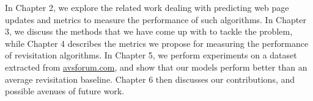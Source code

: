 In Chapter 2, we explore the related work dealing with predicting web page 
updates and metrics to measure the performance of such algorithms. 
In Chapter 3, 
we discuss the methods that we have come up with to tackle the problem, while 
Chapter 4 describes the metrics we propose for measuring the performance of 
revisitation algorithms. 
In Chapter 5, we perform experiments on a dataset 
extracted from \url{avsforum.com}, 
and show that our models perform better than 
an average revisitation baseline. Chapter 6 then discusses our contributions, 
and possible avenues of future work.
